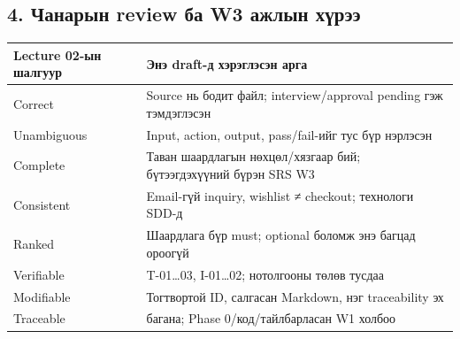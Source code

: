 \subsection{4. Чанарын review ба W3 ажлын
хүрээ}\label{doc3-ux447ux430ux43dux430ux440ux44bux43d-review-ux431ux430-w3-ux430ux436ux43bux44bux43d-ux445ux4afux440ux44dux44d}

\begin{longtable}[]{@{}
  >{\raggedright\arraybackslash}p{}
  >{\raggedright\arraybackslash}p{}@{}}
\toprule\noalign{}
\begin{minipage}[b]{\linewidth}\raggedright
Lecture 02-ын шалгуур
\end{minipage} & \begin{minipage}[b]{\linewidth}\raggedright
Энэ draft-д хэрэглэсэн арга
\end{minipage} \\
\midrule\noalign{}
\endhead
\bottomrule\noalign{}
\endlastfoot
Correct & Source нь бодит файл; interview/approval pending гэж
тэмдэглэсэн \\
Unambiguous & Input, action, output, pass/fail-ийг тус бүр нэрлэсэн \\
Complete & Таван шаардлагын нөхцөл/хязгаар бий; бүтээгдэхүүний бүрэн SRS
W3 \\
Consistent & Email-гүй inquiry, wishlist ≠ checkout; технологи SDD-д \\
Ranked & Шаардлага бүр must; optional боломж энэ багцад ороогүй \\
Verifiable & T-01\ldots03, I-01\ldots02; нотолгооны төлөв тусдаа \\
Modifiable & Тогтвортой ID, салгасан Markdown, нэг traceability эх \\
Traceable & 8 багана; Phase 0/код/тайлбарласан W1 холбоо \\
\end{longtable}

